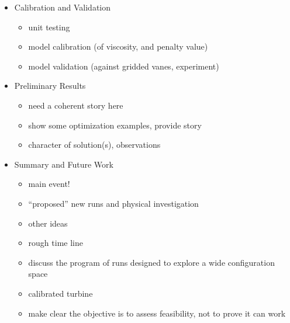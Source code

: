 \documentclass{article}
\begin{document}
\begin{itemize}
 \item Calibration and Validation
       \begin{itemize}
	\item unit testing 
	\item model calibration (of viscosity, and penalty value)
	\item model validation (against gridded vanes, experiment)
       \end{itemize}

 \item Preliminary Results
       \begin{itemize}
        \item need a coherent story here
        \item show some optimization examples, provide story
	\item character of solution(s), observations
       \end{itemize}
 \item Summary and Future Work
       \begin{itemize}
        \item main event!
	\item ``proposed'' new runs and physical investigation
	\item other ideas
	\item rough time line
	\item discuss the program of runs designed to explore a wide configuration space
	\item calibrated turbine
	\item make clear the objective is to assess feasibility, not to prove it can work
       \end{itemize}

\end{itemize}
\end{document}
